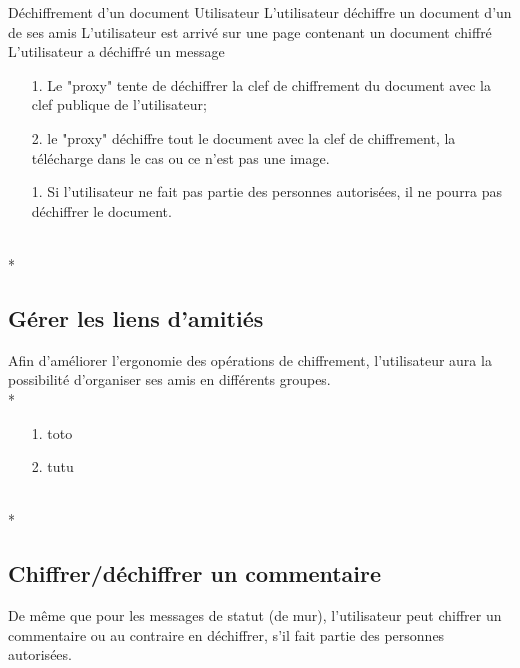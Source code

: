 \documentclass[a4paper,11pt,french]{article}
\begin{document}
\fiche
	{Déchiffrement d'un document}
	{Utilisateur}
	{L'utilisateur déchiffre un document d'un de ses amis}
	{}
	{L'utilisateur est arrivé sur une page contenant un document chiffré}
	{L'utilisateur a déchiffré un message}
    {}
	{\begin{itemize}
        \item[]
		\item[1.] Le "proxy" tente de déchiffrer la clef de chiffrement
            du document avec la clef publique de l'utilisateur;
		\item[2.] le "proxy" déchiffre tout le document avec la clef
            de chiffrement, la télécharge dans le cas ou ce n'est pas
            une image.
	\end{itemize}
	}
	{}
\flots
    {}
    {\begin{itemize}
    \item[]
    \item[1.] Si l'utilisateur ne fait pas partie des personnes
        autorisées, il ne pourra pas déchiffrer le document.
    \end{itemize}
    }
	{}    
\\*

\subsection{Gérer les liens d'amitiés}
Afin d'améliorer l'ergonomie des opérations de chiffrement, 
l'utilisateur aura la possibilité d'organiser ses amis en
différents groupes. \\*

\fiche
	{}
	{}
	{}
	{}
	{}
	{}
	{\begin{itemize}
	    \item[]
		\item[1.] toto
	\end{itemize}
	}
	{\begin{itemize}
        \item[]
		\item[2.] tutu
	\end{itemize}
	}
	{}
\flots
    {}
	{}    
\\*

\subsection{Chiffrer/déchiffrer un commentaire}
De même que pour les messages de statut (de mur), l'utilisateur
peut chiffrer un commentaire ou au contraire en déchiffrer,
s'il fait partie des personnes autorisées.
\end{document}
